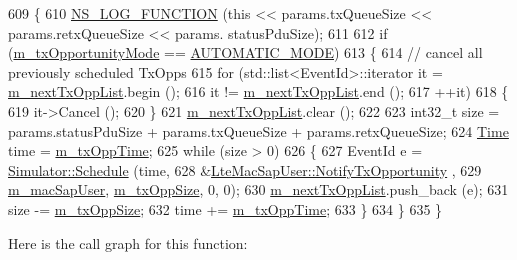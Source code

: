 \begin{DoxyCode}
609 \{
610   \hyperlink{log-macros-disabled_8h_a90b90d5bad1f39cb1b64923ea94c0761}{NS\_LOG\_FUNCTION} (\textcolor{keyword}{this} << params.txQueueSize << params.retxQueueSize << params.
      statusPduSize);
611 
612   \textcolor{keywordflow}{if} (\hyperlink{classns3_1_1LteTestMac_a1f877e33d19780bf870ba97c296e5b25}{m\_txOpportunityMode} == \hyperlink{classns3_1_1LteTestMac_a03b97b13baf84069540a16a8a217ff64a63d254ac10feb6294e3079b3457ef6ac}{AUTOMATIC\_MODE})
613     \{
614       \textcolor{comment}{// cancel all previously scheduled TxOpps}
615       \textcolor{keywordflow}{for} (std::list<EventId>::iterator it = \hyperlink{classns3_1_1LteTestMac_a7e80df8e89db33c7c19f810ec1c3f653}{m\_nextTxOppList}.begin ();
616            it != \hyperlink{classns3_1_1LteTestMac_a7e80df8e89db33c7c19f810ec1c3f653}{m\_nextTxOppList}.end ();
617            ++it)
618         \{          
619           it->Cancel ();
620         \}
621       \hyperlink{classns3_1_1LteTestMac_a7e80df8e89db33c7c19f810ec1c3f653}{m\_nextTxOppList}.clear ();
622 
623       int32\_t size = params.statusPduSize + params.txQueueSize  + params.retxQueueSize;
624       \hyperlink{namespacens3_1_1TracedValueCallback_a7ffd3e7c142ffe7c8a1d2db9b8de38ec}{Time} time = \hyperlink{classns3_1_1LteTestMac_a80a232a577812123507da849b192edb3}{m\_txOppTime};
625       \textcolor{keywordflow}{while} (size > 0)
626         \{
627           EventId e = \hyperlink{classns3_1_1Simulator_a671882c894a08af4a5e91181bf1eec13}{Simulator::Schedule} (time, 
628                                            &\hyperlink{classns3_1_1LteMacSapUser_a02bcc3f8d396751cae20d4b0da65ed68}{LteMacSapUser::NotifyTxOpportunity}
      ,
629                                            \hyperlink{classns3_1_1LteTestMac_ab7d2f5362a3e07bc7694286b0fe5debd}{m\_macSapUser}, \hyperlink{classns3_1_1LteTestMac_a358c818a52e4ae246e676b7c4714da7f}{m\_txOppSize}, 0, 0);
630           \hyperlink{classns3_1_1LteTestMac_a7e80df8e89db33c7c19f810ec1c3f653}{m\_nextTxOppList}.push\_back (e);
631           size -= \hyperlink{classns3_1_1LteTestMac_a358c818a52e4ae246e676b7c4714da7f}{m\_txOppSize};
632           time += \hyperlink{classns3_1_1LteTestMac_a80a232a577812123507da849b192edb3}{m\_txOppTime};
633         \}
634     \}
635 \}
\end{DoxyCode}


Here is the call graph for this function\+:


